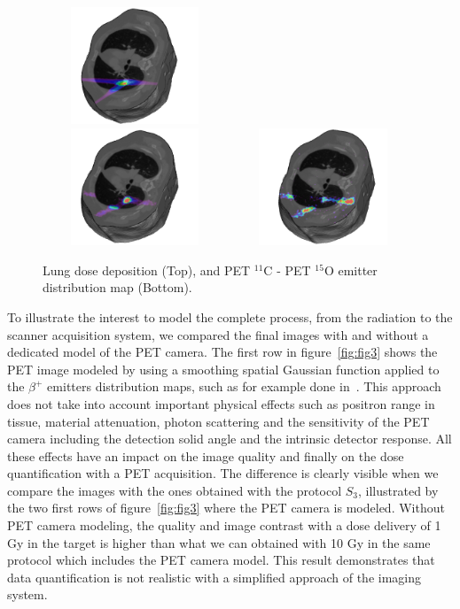 \documentclass[11pt]{iopart}
\begin{document}
\begin{figure}[!h]
  \centering
  \includegraphics[width=55mm,height=35mm]{figures/3D-Dose_poumon.jpg}\\
  \includegraphics[width=55mm,height=35mm]{figures/3D-PETC11_poumon.jpg}
  \includegraphics[width=55mm,height=35mm]{figures/3D-PETO15_poumon.jpg}
  \caption{Lung dose deposition (Top), and PET $^{11}$C - PET $^{15}$O
    emitter distribution map (Bottom).}
  
\label{fig:fig1}
\end{figure}

To illustrate the interest to model the complete process, from the
radiation to the scanner acquisition system, we compared the final
images with and without a dedicated model of the PET camera. The first
row in figure~\ref{fig:fig3} shows the PET image modeled by using a
smoothing spatial Gaussian function applied to the $\beta^{+}$
emitters distribution maps, such as for example done
in~\cite{Parodi2007a}. This approach does not take into account
important physical effects such as positron range in tissue, material
attenuation, photon scattering and the sensitivity of the PET camera
including the detection solid angle and the intrinsic detector
response. All these effects have an impact on the image quality and
finally on the dose quantification with a PET acquisition. The
difference is clearly visible when we compare the images with the ones
obtained with the protocol $S_{3}$, illustrated by the two first rows
of figure~\ref{fig:fig3} where the PET camera is modeled. Without PET
camera modeling, the quality and image contrast with a dose delivery
of 1 Gy in the target is higher than what we can obtained with 10 Gy
in the same protocol which includes the PET camera model. This result
demonstrates that data quantification is not realistic with a
simplified approach of the imaging system.
\end{document}
